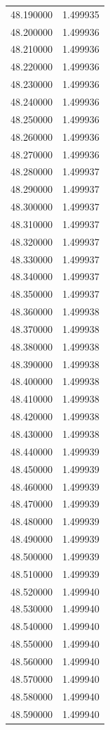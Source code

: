 \begin{tabular}{rr}
48.190000 & 1.499935 \\
48.200000 & 1.499936 \\
48.210000 & 1.499936 \\
48.220000 & 1.499936 \\
48.230000 & 1.499936 \\
48.240000 & 1.499936 \\
48.250000 & 1.499936 \\
48.260000 & 1.499936 \\
48.270000 & 1.499936 \\
48.280000 & 1.499937 \\
48.290000 & 1.499937 \\
48.300000 & 1.499937 \\
48.310000 & 1.499937 \\
48.320000 & 1.499937 \\
48.330000 & 1.499937 \\
48.340000 & 1.499937 \\
48.350000 & 1.499937 \\
48.360000 & 1.499938 \\
48.370000 & 1.499938 \\
48.380000 & 1.499938 \\
48.390000 & 1.499938 \\
48.400000 & 1.499938 \\
48.410000 & 1.499938 \\
48.420000 & 1.499938 \\
48.430000 & 1.499938 \\
48.440000 & 1.499939 \\
48.450000 & 1.499939 \\
48.460000 & 1.499939 \\
48.470000 & 1.499939 \\
48.480000 & 1.499939 \\
48.490000 & 1.499939 \\
48.500000 & 1.499939 \\
48.510000 & 1.499939 \\
48.520000 & 1.499940 \\
48.530000 & 1.499940 \\
48.540000 & 1.499940 \\
48.550000 & 1.499940 \\
48.560000 & 1.499940 \\
48.570000 & 1.499940 \\
48.580000 & 1.499940 \\
48.590000 & 1.499940 \\

\end{tabular}
